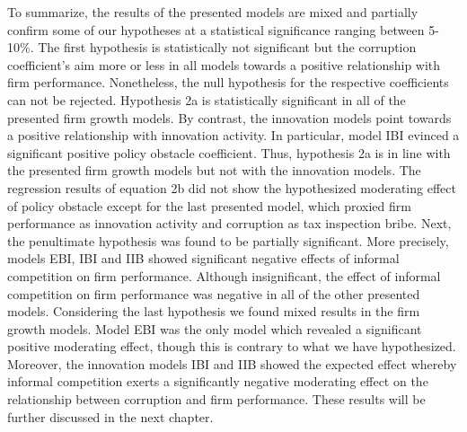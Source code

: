 To summarize, the results of the presented models are mixed and partially confirm some of our hypotheses at a statistical significance ranging between 5-10\%. The first hypothesis is statistically not significant but the corruption coefficient's aim more or less in all models towards a positive relationship with firm performance. Nonetheless, the null hypothesis for the respective coefficients can not be rejected. Hypothesis 2a is statistically significant in all of the presented firm growth models. By contrast, the innovation models point towards a positive relationship with innovation activity. In particular, model IBI evinced a significant positive policy obstacle coefficient. Thus, hypothesis 2a is in line with the presented firm growth models but not with the innovation models. The regression results of equation 2b did not show the hypothesized moderating effect of policy obstacle except for the last presented model, which proxied firm performance as innovation activity and corruption as tax inspection bribe. Next, the penultimate hypothesis was found to be partially significant. More precisely, models EBI, IBI and IIB showed significant negative effects of informal competition on firm performance. Although insignificant, the effect of informal competition on firm performance was negative in all of the other presented models. Considering the last hypothesis we found mixed results in the firm growth models. Model EBI was the only model which revealed a significant positive moderating effect, though this is contrary to what we have hypothesized. Moreover, the innovation models IBI and IIB showed the expected effect whereby informal competition exerts a significantly negative moderating effect on the relationship between corruption and firm performance. These results will be further discussed in the next chapter.